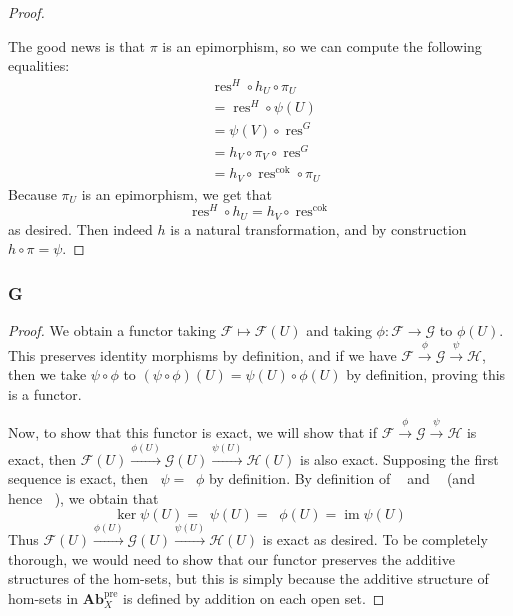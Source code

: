 \documentclass{article}
\newcommand{\fF}{\mathscr{F}}
\newcommand{\fG}{\mathscr{G}}
\newcommand{\fH}{\mathscr{H}}
\DeclareMathOperator{\res}{res}
\DeclareMathOperator{\im}{im}
\DeclareMathOperator{\cok}{cok}
\DeclareMathOperator{\kerpre}{\ker_{\text{pre}}}
\DeclareMathOperator{\cokpre}{\cok_{\text{pre}}}
\DeclareMathOperator{\impre}{\im_{\text{pre}}}
\newcommand{\Ab}{\mathbf{Ab}} %
\begin{document}
\begin{proof}
    \begin{center}
    \end{center}
    The good news is that $\pi$ is an epimorphism, so we can compute the following equalities:
    \begin{align*}
        &\res^H \circ h_U \circ \pi_U\\
        &=\res^H\circ \psi(U)\\
        &=\psi(V)\circ \res^G\\
        &=h_V\circ \pi_V\circ \res^G\\
        &=h_V\circ \res^{\cok}\circ \pi_U
    \end{align*}
    Because $\pi_U$ is an epimorphism, we get that
    \[
    \res^H\circ h_U=h_V\circ \res^{\cok}
    \]
    as desired. Then indeed $h$ is a natural transformation, and by construction $h\circ \pi=\psi$.
\end{proof}
\subsubsection{G}\label{2.3.G}
\begin{proof}
    We obtain a functor taking $\fF \mapsto \fF(U)$ and taking $\phi:\fF\to \fG$ to $\phi(U)$. This preserves identity morphisms by definition, and if we have $\fF \xrightarrow{\phi} \fG \xrightarrow{\psi} \fH$, then we take $\psi\circ \phi$ to $(\psi\circ \phi)(U)=\psi(U)\circ \phi(U)$ by definition, proving this is a functor.

    Now, to show that this functor is exact, we will show that if $\fF \xrightarrow{\phi} \fG \xrightarrow{\psi} \fH$ is exact, then $\fF(U) \xrightarrow{\phi(U)} \fG(U) \xrightarrow{\psi(U)} \fH(U)$ is also exact. Supposing the first sequence is exact, then $\kerpre \psi=\impre \phi$ by definition. By definition of $\kerpre$ and $\cokpre$ (and hence $\impre$), we obtain that
    \[
    \ker \psi(U)=\kerpre \psi(U)=\impre \phi (U)=\im \psi(U)
    \]
    Thus $\fF(U) \xrightarrow{\phi(U)} \fG(U) \xrightarrow{\psi(U)} \fH(U)$ is exact as desired. To be completely thorough, we would need to show that our functor preserves the additive structures of the hom-sets, but this is simply because the additive structure of hom-sets in $\Ab_X^{\text{pre}}$ is defined by addition on each open set.
\end{proof}
\end{document}
